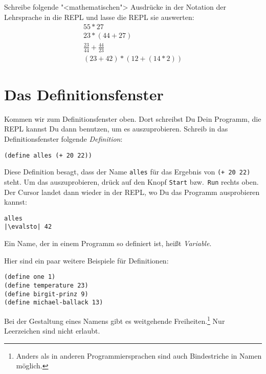 \begin{aufgabeinline}
  Schreibe folgende "<mathematischen"> Ausdrücke in der Notation der
  Lehrsprache in die REPL und lasse die REPL sie auswerten:
  \begin{displaymath}
    \begin{array}{c}
      55 * 27\\
      23 * (44 + 27)\\
      \frac{23}{44} + \frac{44}{23}\\
      (23 + 42) * (12 + (14 * 2))
    \end{array}
  \end{displaymath}
\end{aufgabeinline}
%
\section{Das Definitionsfenster}

Kommen wir zum Definitionsfenster oben.  Dort schreibst Du Dein
Programm, die REPL kannst Du dann benutzen, um es auszuprobieren.
Schreib in das Definitionsfenster folgende
\textit{Definition}:
%
\begin{lstlisting}
(define alles (+ 20 22))
\end{lstlisting}
%
Diese Definition besagt, dass der Name \lstinline{alles} für das Ergebnis
von \lstinline{(+ 20 22)} steht.  Um das auszuprobieren, drück auf den
Knopf \texttt{Start} bzw.\ \texttt{Run} rechts oben.  Der Cursor
landet dann wieder in der REPL, wo Du das Programm ausprobieren
kannst:
%
\begin{lstlisting}
alles
|\evalsto| 42
\end{lstlisting}
%
Ein Name, der in einem Programm so definiert ist, heißt
\textit{Variable}.

Hier sind ein paar weitere Beispiele für Definitionen:
%
\begin{lstlisting}
(define one 1)
(define temperature 23)
(define birgit-prinz 9)
(define michael-ballack 13)
\end{lstlisting}
%
Bei der Gestaltung eines Namens gibt es weitgehende
Freiheiten.\footnote{Anders als in anderen Programmiersprachen sind
  auch Bindestriche in Namen möglich.}  Nur Leerzeichen sind nicht
erlaubt.

